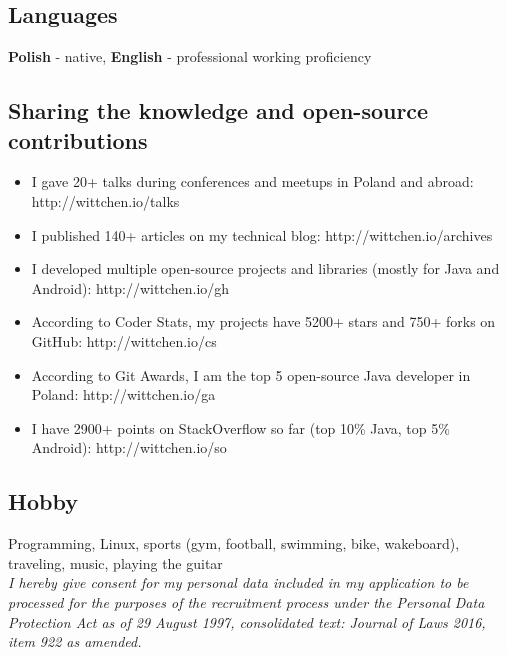 \documentclass[8pt]{extarticle}
\begin{document}
    \subsection*{\normalsize{Languages}}
    \textbf{Polish} - native, \textbf{English} - professional working proficiency

    \subsection*{\normalsize{Sharing the knowledge and open-source contributions}}
    \begin{itemize}
      \item I gave 20+ talks during conferences and meetups in Poland and abroad: http://wittchen.io/talks
      \item I published 140+ articles on my technical blog: http://wittchen.io/archives
      \item I developed multiple open-source projects and libraries (mostly for Java and Android): http://wittchen.io/gh
      \item According to Coder Stats, my projects have 5200+ stars and 750+ forks on GitHub: http://wittchen.io/cs
      \item According to Git Awards, I am the top 5 open-source Java developer in Poland: http://wittchen.io/ga
      \item I have 2900+ points on StackOverflow so far (top 10\% Java, top 5\% Android): http://wittchen.io/so
    \end{itemize}

    \subsection*{\normalsize{Hobby}}
    Programming, Linux, sports (gym, football, swimming, bike, wakeboard), traveling, music, playing the guitar\\

    \textit{
    I hereby give consent for my personal data included in my application
    to be processed for the purposes of the recruitment process
    under the Personal Data Protection Act as of 29 August 1997,
    consolidated text: Journal of Laws 2016, item 922 as amended.
    }
\end{document}
